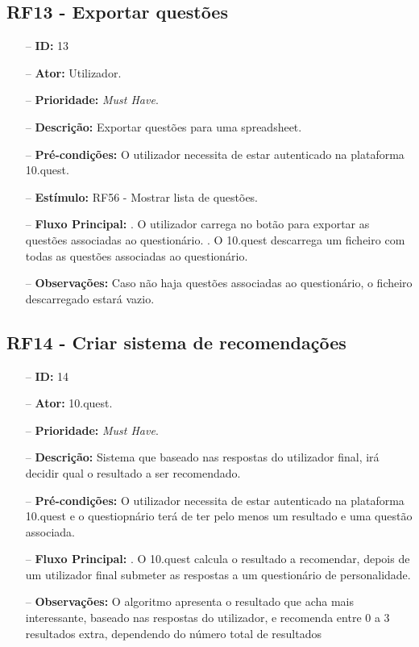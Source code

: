 \subsection{RF13 - Exportar questões}
\begin{itemize}
	\item[--] \textbf{ID:} 13
	\item[--]  \textbf{Ator:} Utilizador.
	\item[--]  \textbf{Prioridade:} \textit{Must Have}.
	\item[--]  \textbf{Descrição:} Exportar questões para uma spreadsheet.
	\item[--]  \textbf{Pré-condições:} O utilizador necessita de estar autenticado na plataforma 10.quest.
	\item[--]  \textbf{Estímulo:}  
		\subitem RF56 - Mostrar lista de questões.
	\item[--]  \textbf{Fluxo Principal:} 
		. O utilizador carrega no botão para exportar as questões associadas ao questionário.
		. O 10.quest descarrega um ficheiro com todas as questões associadas ao questionário.
	\item[--]  \textbf{Observações:} Caso não haja questões associadas ao questionário, o ficheiro descarregado estará vazio.
\end{itemize}
\newpage

\subsection{RF14 - Criar sistema de recomendações}
\begin{itemize}
	\item[--] \textbf{ID:} 14
	\item[--]  \textbf{Ator:} 10.quest.
	\item[--]  \textbf{Prioridade:} \textit{Must Have}.
	\item[--]  \textbf{Descrição:} Sistema que baseado nas respostas do utilizador final, irá decidir qual o resultado a ser recomendado.
	\item[--]  \textbf{Pré-condições:}  O utilizador necessita de estar autenticado na plataforma 10.quest e o questiopnário terá de ter pelo menos um resultado e uma questão associada.
	\item[--]  \textbf{Fluxo Principal:} 
		. O 10.quest calcula o resultado a recomendar, depois de um utilizador final submeter as respostas a um questionário de personalidade.
	\item[--]  \textbf{Observações:} O algoritmo apresenta o resultado que acha mais interessante, baseado nas respostas do utilizador, e recomenda entre 0 a 3 resultados extra, dependendo do número total de resultados 
\end{itemize}
\newpage

